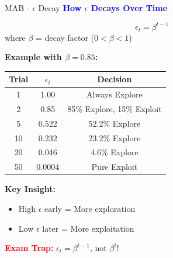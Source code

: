 \documentclass[8pt]{beamer}
\begin{document}
	\begin{frame}{MAB - $\epsilon$ Decay}
		\fontsize{6.5}{7.5}\selectfont
		\textcolor{blue}{\textbf{How $\epsilon$ Decays Over Time}}
		
		\[
		\epsilon_t = \beta^{t-1}
		\]
		where $\beta$ = decay factor ($0 < \beta < 1$)
		
		\textbf{Example with $\beta = 0.85$:}
		
		\begin{tabular}{|c|c|c|}
			\hline
			\textbf{Trial} & \textbf{$\epsilon_t$} & \textbf{Decision} \\
			\hline
			1 & 1.00 & Always Explore \\
			\hline
			2 & 0.85 & 85\% Explore, 15\% Exploit \\
			\hline
			5 & 0.522 & 52.2\% Explore \\
			\hline
			10 & 0.232 & 23.2\% Explore \\
			\hline
			20 & 0.046 & 4.6\% Explore \\
			\hline
			50 & 0.0004 & Pure Exploit \\
			\hline
		\end{tabular}
		
		\textbf{Key Insight:}
		\begin{itemize}
			\item High $\epsilon$ early = More exploration
			\item Low $\epsilon$ later = More exploitation
		\end{itemize}
		
		\textcolor{red}{\textbf{Exam Trap:}} $\epsilon_t = \beta^{t-1}$, not $\beta^t$!
	\end{frame}
	
\end{document}
